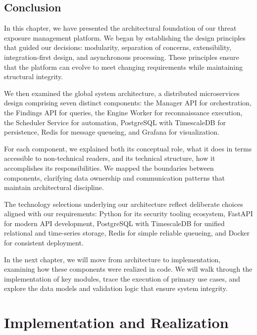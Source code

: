 \documentclass[a4paper,12pt]{report}
\begin{document}
\section*{Conclusion}

In this chapter, we have presented the architectural foundation of our threat exposure management platform. We began by establishing the design principles that guided our decisions: modularity, separation of concerns, extensibility, integration-first design, and asynchronous processing. These principles ensure that the platform can evolve to meet changing requirements while maintaining structural integrity.\hfill \break

We then examined the global system architecture, a distributed microservices design comprising seven distinct components: the Manager API for orchestration, the Findings API for queries, the Engine Worker for reconnaissance execution, the Scheduler Service for automation, PostgreSQL with TimescaleDB for persistence, Redis for message queueing, and Grafana for visualization.\hfill \break

For each component, we explained both its conceptual role, what it does in terms accessible to non-technical readers, and its technical structure, how it accomplishes its responsibilities. We mapped the boundaries between components, clarifying data ownership and communication patterns that maintain architectural discipline.\hfill \break

The technology selections underlying our architecture reflect deliberate choices aligned with our requirements: Python for its security tooling ecosystem, FastAPI for modern API development, PostgreSQL with TimescaleDB for unified relational and time-series storage, Redis for simple reliable queueing, and Docker for consistent deployment.\hfill \break

In the next chapter, we will move from architecture to implementation, examining how these components were realized in code. We will walk through the implementation of key modules, trace the execution of primary use cases, and explore the data models and validation logic that ensure system integrity.\hfill \break


\chapter{Implementation and Realization}
\thispagestyle{plain}
\end{document}
